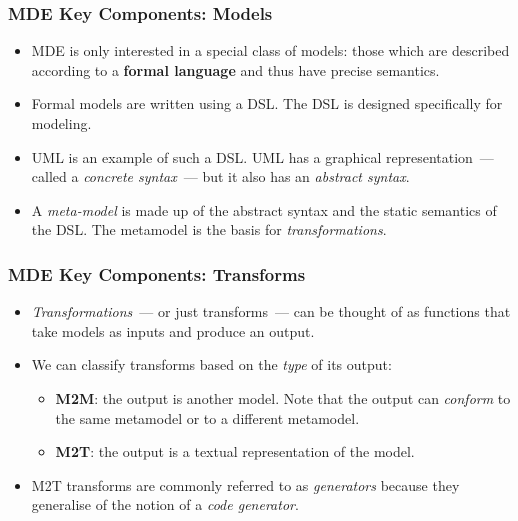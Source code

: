 \documentclass{beamer}
\begin{document}
\begin{frame}
\frametitle{\ac{MDE} Key Components: Models}

\begin{itemize}

\item \ac{MDE} is only interested in a special class of models: those
  which are described according to a \textbf{formal language} and thus
  have precise semantics.

\pause

\item Formal models are written using a \acf{DSL}. The \ac{DSL} is
  designed specifically for modeling.

\pause

\item
  \acf{UML} is an example of such a \ac{DSL}. \ac{UML} has a graphical
  representation~--- called a \emph{concrete syntax}~--- but it also
  has an \emph{abstract syntax}.

\pause

\item A \emph{meta-model} is made up of the abstract syntax and the
  static semantics of the \ac{DSL}. The metamodel is the basis for
  \emph{transformations}.

\end{itemize}

\end{frame}

\begin{frame}
\frametitle{\ac{MDE} Key Components: Transforms}

\begin{itemize}
\item \emph{Transformations}~--- or just transforms~--- can be thought
  of as functions that take models as inputs and produce an output.

\pause

\item We can classify transforms based on the \emph{type} of its
  output:

\pause

\begin{itemize}

\item \textbf{\acf{M2M}}: the output is another model. Note that the
  output can \emph{conform} to the same metamodel or to a different
  metamodel.

\pause

\item \textbf{\acf{M2T}}: the output is a textual representation of
  the model.

\end{itemize}

\pause

\item \ac{M2T} transforms are commonly referred to as
  \emph{generators} because they generalise of the notion of a
  \emph{code generator}.

\end{itemize}

\end{frame}
\end{document}
